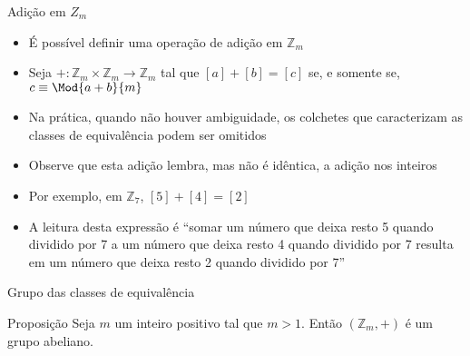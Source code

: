 \begin{frame}[fragile]{Adição em $Z_m$}

    \begin{itemize}
        \item É possível definir uma operação de adição em $\mathbb{Z}_m$

        \item Seja $+: \mathbb{Z}_m\times \mathbb{Z}_m \to \mathbb{Z}_m$ tal que
        $[a] + [b] = [c]$ se, e somente se, $c\equiv \Mod{a + b}{m}$

        \item Na prática, quando não houver ambiguidade, os colchetes que caracterizam as classes
            de equivalência podem ser omitidos

        \item Observe que esta adição lembra, mas não é idêntica, a adição nos inteiros

        \item Por exemplo, em $\mathbb{Z}_7$, $[5] + [4] = [2]$ 

        \item A leitura desta expressão é ``somar um número que deixa resto 5 quando dividido por
            7 a um número que deixa resto 4 quando dividido por 7 resulta em um número que deixa
            resto 2 quando dividido por 7''
    \end{itemize}

\end{frame}

\begin{frame}[fragile]{Grupo das classes de equivalência}

    \begin{block}{Proposição}
        Seja $m$ um inteiro positivo tal que $m > 1$. Então $(\mathbb{Z}_m, +)$ é um grupo
            abeliano.
    \end{block}

\end{frame}

